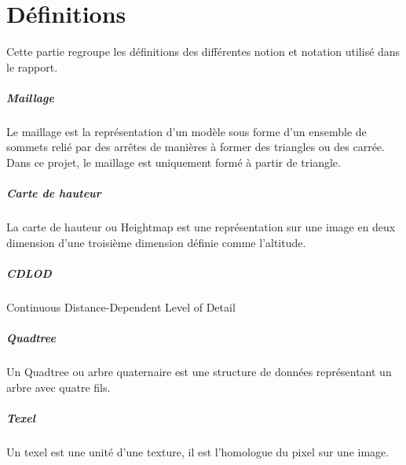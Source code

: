   \chapter*{Définitions}
    Cette partie regroupe les définitions des différentes notion et notation utilisé dans le rapport.
    
    
    \paragraph{Maillage} Le maillage est la représentation d'un modèle sous forme d'un ensemble de sommets relié par des arrêtes de manières à former des triangles ou des carrée. Dans ce projet, le maillage est uniquement formé à partir de triangle.
    
    \paragraph{Carte de hauteur} La carte de hauteur ou Heightmap est une représentation sur une image en deux dimension d'une troisième dimension définie comme l'altitude. 
    
    \paragraph{CDLOD} Continuous Distance-Dependent Level of Detail
    \paragraph{Quadtree} Un Quadtree ou arbre quaternaire est une structure de données représentant un arbre avec quatre fils.
    \paragraph{Texel} Un texel est une unité d'une texture, il est l'homologue du pixel sur une image.
